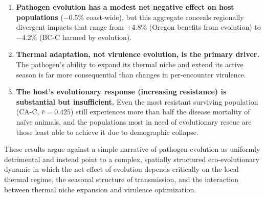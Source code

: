 \begin{enumerate}
  \item \textbf{Pathogen evolution has a modest net negative effect
    on host populations} ($-$0.5\% coast-wide), but this aggregate
    conceals regionally divergent impacts that range from $+$4.8\% 
    (Oregon benefits from evolution) to $-$4.2\% (BC-C harmed by 
    evolution).
  \item \textbf{Thermal adaptation, not virulence evolution, is the
    primary driver.}  The pathogen's ability to expand its thermal
    niche and extend its active season is far more consequential than
    changes in per-encounter virulence.
  \item \textbf{The host's evolutionary response (increasing
    resistance) is substantial but insufficient.}  Even the most
    resistant surviving population (CA-C, $\bar{r} = 0.425$) still
    experiences more than half the disease mortality of na\"ive
    animals, and the populations most in need of evolutionary rescue
    are those least able to achieve it due to demographic collapse.
\end{enumerate}

\noindent
These results argue against a simple narrative of pathogen evolution as
uniformly detrimental and instead point to a complex, spatially
structured eco-evolutionary dynamic in which the net effect of
evolution depends critically on the local thermal regime, the seasonal
structure of transmission, and the interaction between thermal niche
expansion and virulence optimization.
